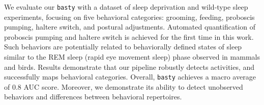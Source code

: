 We evaluate our \texttt{basty} with a dataset of sleep deprivation and wild-type sleep experiments, focusing on five behavioral categories: grooming, feeding, proboscis pumping, haltere switch, and postural adjustments.
Automated quantification of proboscis pumping and haltere switch is achieved for the first time in this work.
Such behaviors are potentially related to behaviorally defined states of sleep similar to the REM sleep (rapid eye movement sleep) phase observed in mammals and birds.
Results demonstrate that our pipeline robustly detects activities, and successfully maps behavioral categories.
Overall, \texttt{basty} achieves a macro average of 0.8 AUC score.
Moreover, we demonstrate its ability to detect unobserved behaviors and differences between behavioral repertoires.



